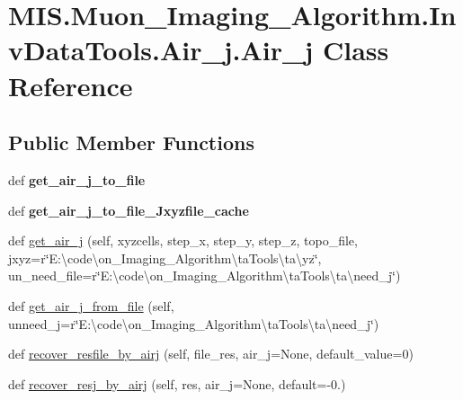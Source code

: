 \hypertarget{classMIS_1_1Muon__Imaging__Algorithm_1_1InvDataTools_1_1Air__j_1_1Air__j}{}\section{M\+I\+S.\+Muon\+\_\+\+Imaging\+\_\+\+Algorithm.\+Inv\+Data\+Tools.\+Air\+\_\+j.\+Air\+\_\+j Class Reference}
\label{classMIS_1_1Muon__Imaging__Algorithm_1_1InvDataTools_1_1Air__j_1_1Air__j}
\subsection*{Public Member Functions}
\begin{DoxyCompactItemize}
\item 
\mbox{\label{classMIS_1_1Muon__Imaging__Algorithm_1_1InvDataTools_1_1Air__j_1_1Air__j_a15421921159716316e21ad6cb5587415}} 
def {\bfseries get\+\_\+air\+\_\+j\+\_\+to\+\_\+file}
\item 
\mbox{\label{classMIS_1_1Muon__Imaging__Algorithm_1_1InvDataTools_1_1Air__j_1_1Air__j_abfa7edb92f5dbafc238b825b19da8dc0}} 
def {\bfseries get\+\_\+air\+\_\+j\+\_\+to\+\_\+file\+\_\+\+Jxyzfile\+\_\+cache}
\item 
def \hyperlink{classMIS_1_1Muon__Imaging__Algorithm_1_1InvDataTools_1_1Air__j_1_1Air__j_a8db4d91a279315013350bf3bfb52485a}{get\+\_\+air\+\_\+j} (self, xyzcells, step\+\_\+x, step\+\_\+y, step\+\_\+z, topo\+\_\+file, jxyz=r\char`\"{}E\+:\textbackslash{}code\textbackslash{}on\+\_\+\+Imaging\+\_\+\+Algorithm\textbackslash{}ta\+Tools\textbackslash{}ta\textbackslash{}yz\char`\"{}, un\+\_\+need\+\_\+file=r\char`\"{}E\+:\textbackslash{}code\textbackslash{}on\+\_\+\+Imaging\+\_\+\+Algorithm\textbackslash{}ta\+Tools\textbackslash{}ta\textbackslash{}need\+\_\+j\char`\"{})
\item 
def \hyperlink{classMIS_1_1Muon__Imaging__Algorithm_1_1InvDataTools_1_1Air__j_1_1Air__j_a93b1afae65366af68f04d6a48dbc17dd}{get\+\_\+air\+\_\+j\+\_\+from\+\_\+file} (self, unneed\+\_\+j=r\char`\"{}E\+:\textbackslash{}code\textbackslash{}on\+\_\+\+Imaging\+\_\+\+Algorithm\textbackslash{}ta\+Tools\textbackslash{}ta\textbackslash{}need\+\_\+j\char`\"{})
\item 
def \hyperlink{classMIS_1_1Muon__Imaging__Algorithm_1_1InvDataTools_1_1Air__j_1_1Air__j_a2e335009fe6fa19d7056f59bdf44511c}{recover\+\_\+resfile\+\_\+by\+\_\+airj} (self, file\+\_\+res, air\+\_\+j=None, default\+\_\+value=0)
\item 
def \hyperlink{classMIS_1_1Muon__Imaging__Algorithm_1_1InvDataTools_1_1Air__j_1_1Air__j_ada2ee91267d1f52026724c813da3e33b}{recover\+\_\+resj\+\_\+by\+\_\+airj} (self, res, air\+\_\+j=None, default=-\/0.)
\end{DoxyCompactItemize}

